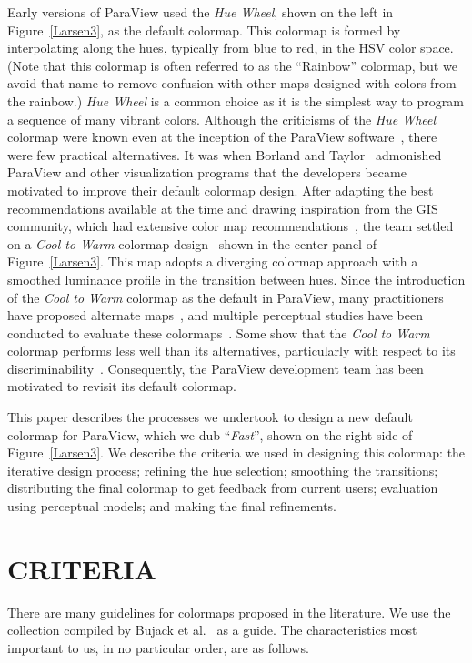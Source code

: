\documentclass{IEEEcsmag}
\newcommand*{\colormap}[1]{\textsl{#1}\xspace}
\newcommand*{\huewheel}{\colormap{Hue Wheel}}
\newcommand*{\coolwarm}{\colormap{Cool to Warm}}
\newcommand*{\fast}{\colormap{Fast}}
\begin{document}
Early versions of ParaView used the \huewheel, shown on the left in Figure~\ref{Larsen3}, as the default colormap.
This colormap is formed by interpolating along the hues, typically from blue to red, in the HSV color space.
(Note that this colormap is often referred to as the ``Rainbow'' colormap, but we avoid that name to remove confusion with other maps designed with colors from the rainbow.)
\huewheel is a common choice as it is the simplest way to program a sequence of many vibrant colors.
Although the criticisms of the \huewheel colormap were known even at the inception of the ParaView software~\cite{Rogowitz1998}, there were few practical alternatives.
It was when Borland and Taylor~\cite{Borland2007} admonished ParaView and other visualization programs that the developers became motivated to improve their default colormap design.
After adapting the best recommendations available at the time and drawing inspiration from the GIS community, which had extensive color map recommendations~\cite{Brewer2003}, the team settled on a \coolwarm colormap design~\cite{Moreland2009} shown in the center panel of Figure~\ref{Larsen3}.
This map adopts a diverging colormap approach with a smoothed luminance profile in the transition between hues.
Since the introduction of the \coolwarm colormap as the default in ParaView, many practitioners have proposed alternate maps~\cite{Samsel2015}, and multiple perceptual studies have been conducted to evaluate these colormaps~\cite{Ware2017}.
Some show that the \coolwarm colormap performs less well than its alternatives, particularly with respect to its discriminability~\cite{Ware2017,Ware2019}.
Consequently, the ParaView development team has been motivated to revisit its default colormap.

This paper describes the processes we undertook to design a new default colormap for ParaView, which we dub ``\fast'', shown on the right side of Figure~\ref{Larsen3}.
We describe the criteria we used in designing this colormap: the iterative design process; refining the hue selection; smoothing the transitions; distributing the final colormap to get feedback from current users; evaluation using perceptual models; and making the final refinements.


\section{CRITERIA}

There are many guidelines for colormaps proposed in the literature. We use the collection compiled by Bujack et al.~\cite{Bujack2018} as a guide. The characteristics most important to us, in no particular order, are as follows.
\end{document}
